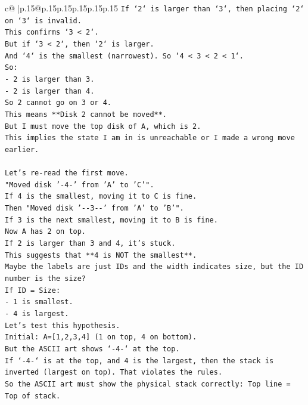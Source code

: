 \documentclass{article}
\begin{document}
{\begin{supertabular}{c@{$\;$}|p{.15\linewidth}@{}p{.15\linewidth}p{.15\linewidth}p{.15\linewidth}p{.15\linewidth}p{.15\linewidth}}
{{{\texttt{If `2` is larger than `3`, then placing `2` on `3` is invalid.} \\
\texttt{This confirms `3 < 2`.} \\
\texttt{But if `3 < 2`, then `2` is larger.} \\
\texttt{And `4` is the smallest (narrowest). So `4 < 3 < 2 < 1`.} \\
\texttt{So:} \\
\texttt{{-} 2 is larger than 3.} \\
\texttt{{-} 2 is larger than 4.} \\
\texttt{So 2 cannot go on 3 or 4.} \\
\texttt{This means **Disk 2 cannot be moved**.} \\
\texttt{But I must move the top disk of A, which is 2.} \\
\texttt{This implies the state I am in is unreachable or I made a wrong move earlier.} \\
\\ 
\texttt{Let's re{-}read the first move.} \\
\texttt{"Moved disk '{-}4{-}' from 'A' to 'C'".} \\
\texttt{If 4 is the smallest, moving it to C is fine.} \\
\texttt{Then "Moved disk '{-}{-}3{-}{-}' from 'A' to 'B'".} \\
\texttt{If 3 is the next smallest, moving it to B is fine.} \\
\texttt{Now A has 2 on top.} \\
\texttt{If 2 is larger than 3 and 4, it's stuck.} \\
\texttt{This suggests that **4 is NOT the smallest**.} \\
\texttt{Maybe the labels are just IDs and the width indicates size, but the ID number is the size?} \\
\texttt{If ID = Size:} \\
\texttt{{-} 1 is smallest.} \\
\texttt{{-} 4 is largest.} \\
\texttt{Let's test this hypothesis.} \\
\texttt{Initial: A={[}1,2,3,4{]} (1 on top, 4 on bottom).} \\
\texttt{But the ASCII art shows `{-}4{-}` at the top.} \\
\texttt{If `{-}4{-}` is at the top, and 4 is the largest, then the stack is inverted (largest on top). That violates the rules.} \\
\texttt{So the ASCII art must show the physical stack correctly: Top line = Top of stack.} \\
}}}
\end{supertabular}}
\end{document}

